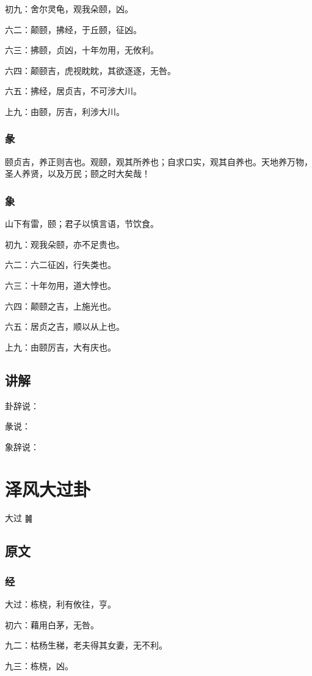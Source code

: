 \documentclass[12pt,oneside]{book}
\begin{document}
初九：舍尔灵龟，观我朵颐，凶。

六二：颠颐，拂经，于丘颐，征凶。

六三：拂颐，贞凶，十年勿用，无攸利。

六四：颠颐吉，虎视眈眈，其欲逐逐，无咎。

六五：拂经，居贞吉，不可涉大川。

上九：由颐，厉吉，利涉大川。

\subsection{彖}
颐贞吉，养正则吉也。观颐，观其所养也；自求口实，观其自养也。天地养万物，圣人养贤，以及万民；颐之时大矣哉！
\subsection{象}
山下有雷，颐；君子以慎言语，节饮食。

初九：观我朵颐，亦不足贵也。

六二：六二征凶，行失类也。

六三：十年勿用，道大悖也。

六四：颠颐之吉，上施光也。

六五：居贞之吉，顺以从上也。

上九：由颐厉吉，大有庆也。

\section{讲解}
卦辞说：

彖说：

象辞说：


\chapter{泽风大过卦}
大过 {\Large ䷛}

\section{原文}

\subsection{经}
大过：栋桡，利有攸往，亨。

初六：藉用白茅，无咎。

九二：枯杨生稊，老夫得其女妻，无不利。

九三：栋桡，凶。
\end{document}
